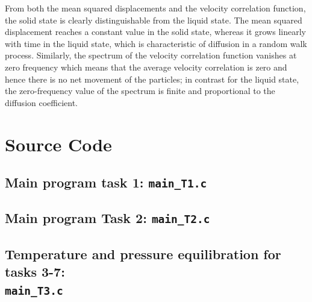 From both the mean squared displacements and the velocity correlation function, the solid state is 
clearly distinguishable from the liquid state. The mean squared displacement reaches a constant value in the solid state, whereas it grows linearly with time in the liquid state, which is characteristic of diffusion in a random walk process. Similarly, the spectrum of the velocity correlation function vanishes at zero frequency which means that the average velocity correlation is zero and hence there is no net movement of the particles; in contrast for the liquid state, the zero-frequency value of the spectrum is finite and proportional to the diffusion coefficient. 
\newpage

\appendix

\section{Source Code}

%

%

\subsection{Main program task 1: \texttt{main\_T1.c}}


\subsection{Main program  Task 2: \texttt{main\_T2.c}}


\subsection{Temperature and pressure equilibration for tasks 3-7:\\ \texttt{main\_T3.c}}


